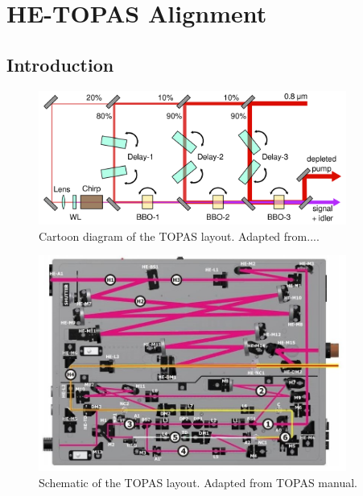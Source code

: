 \chapter{HE-TOPAS Alignment}
\label{TOPAS}




\section{Introduction}
\label{intro_TOPAS}

\begin{figure}
	\centering
	\includegraphics[width=0.9\textwidth]{figures/TOPAS/topas_cartoon.png}
	\caption{Cartoon diagram of the TOPAS layout. Adapted from....}
	\label{TOPAS_cartoon}
\end{figure}

\begin{figure}
	\centering
	\includegraphics[width=0.9\textwidth]{figures/TOPAS/schematic_lightcon.jpg}
	\caption{Schematic of the TOPAS layout. Adapted from TOPAS manual.}
	\label{TOPAS_schematic}
\end{figure}